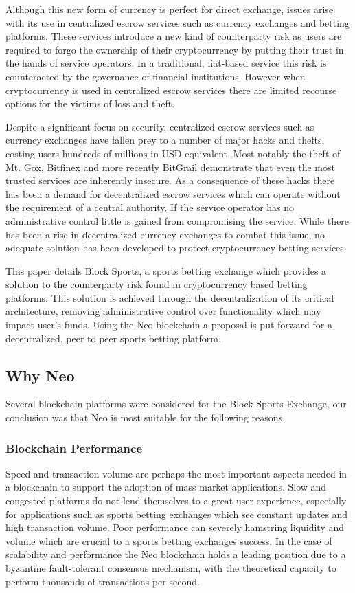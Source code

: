 \documentclass{article}
\begin{document}
Although this new form of currency is perfect for direct exchange, issues arise with its use in centralized escrow services such as currency exchanges and betting platforms. These services introduce a new kind of counterparty risk as users are required to forgo the ownership of their cryptocurrency by putting their trust in the hands of service operators. In a traditional, fiat-based service this risk is counteracted by the governance of financial institutions. However when cryptocurrency is used in centralized escrow services there are limited recourse options for the victims of loss and theft.

Despite a significant focus on security, centralized escrow services such as currency exchanges have fallen prey to a number of major hacks and thefts, costing users hundreds of millions in USD equivalent. Most notably the theft of Mt. Gox, Bitfinex and more recently BitGrail demonstrate that even the most trusted services are inherently insecure. As a consequence of these hacks there has been a demand for decentralized escrow services which can operate without the requirement of a central authority. If the service operator has no administrative control little is gained from compromising the service. While there has been a rise in decentralized currency exchanges to combat this issue, no adequate solution has been developed to protect cryptocurrency betting services. 

This paper details Block Sports, a sports betting exchange which provides a solution to the counterparty risk found in cryptocurrency based betting platforms. This solution is achieved through the decentralization of its critical architecture, removing administrative control over functionality which may impact user’s funds. Using the Neo blockchain a proposal is put forward for a decentralized, peer to peer sports betting platform.

	\subsection{Why Neo}
Several blockchain platforms were considered for the Block Sports Exchange, our conclusion was that Neo is most suitable for the following reasons.

		\subsubsection{Blockchain Performance}
Speed and transaction volume are perhaps the most important aspects needed in a blockchain to support the adoption of mass market applications. Slow and congested platforms do not lend themselves to a great user experience, especially for applications such as sports betting exchanges which see constant updates and high transaction volume. Poor performance can severely hamstring liquidity and volume which are crucial to a sports betting exchanges success. In the case of scalability and performance the Neo blockchain holds a leading position due to a byzantine fault-tolerant consensus mechanism, with the theoretical capacity to perform thousands of transactions per second.
\end{document}
